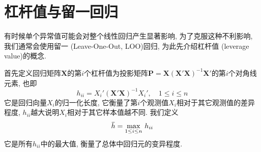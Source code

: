 \documentclass[cn, 12pt, math=mtpro2, bibstyle=apa, blue, twocol]{elegantbook}
\newcommand{\X}{\mathbold{X}}
\newcommand{\overbar}[1]{\mkern 1.5mu\overline{\mkern-1.5mu#1\mkern-1.5mu}\mkern 1.5mu}
\begin{document}
\section{杠杆值与留一回归}
有时候单个异常值可能会对整个线性回归产生显著影响, 为了克服这种不利影响, 我们通常会使用留一 (Leave-One-Out, LOO)回归, 为此先介绍杠杆值 (leverage value)的概念.

首先定义回归矩阵$\X$的第$i$个杠杆值为投影矩阵$\mathbold{P}=\X(\X'\X)^{-1}\X'$的第$i$个对角线元素, 也即
$$h_{ii}=X_i'(\X'\X)^{-1}X_i',\quad 1\leq i\leq n$$
它是回归向量$X_i$的归一化长度, 它衡量了第$i$个观测值$X_i$相对于其它观测值的差异程度, $h_{ii}$越大说明$X_i$相对于其它样本值越不同. 我们定义
\begin{equation}\label{eq2.2}
  \overbar{h}=\max_{1\leq i\leq n}\,h_{ii}
\end{equation}
它是所有$h_{ii}$中的最大值, 衡量了总体中回归元的变异程度.
\end{document}
